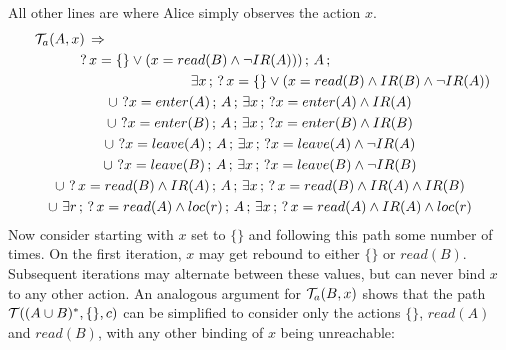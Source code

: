 All other lines are where Alice simply observes the action $x$. \begin{gather*}
\mathcal{T}_{a}(A,x)\,\Rightarrow\,\,\,\,\,\,\,\,\,\,\,\,\,\,\,\,\,\,\,\,\,\,\,\,\,\,\,\,\,\,\,\,\,\,\,\,\,\,\,\,\,\,\,\,\,\,\,\,\,\,\,\,\,\,\,\,\,\,\,\,\,\,\,\,\,\,\,\,\,\,\,\,\,\,\,\,\,\,\,\,\,\,\,\,\,\,\,\,\,\,\,\,\,\,\,\,\,\,\,\,\,\,\,\,\,\,\,\,\,\,\,\,\,\,\,\,\,\,\,\,\,\,\,\,\,\,\,\,\,\,\,\,\,\,\,\,\,\,\,\,\,\,\,\,\,\,\,\,\,\,\,\,\,\,\,\,\,\,\,\,\,\,\,\\
?\, x=\{\}\vee(x=read(B)\wedge\neg IR(A)))\,;\, A\,;\,\,\,\,\,\,\,\,\,\,\,\,\,\,\,\,\,\,\,\,\,\,\,\,\,\,\,\,\,\,\,\,\,\,\,\,\,\,\,\,\,\,\,\,\,\,\,\\
\,\,\,\,\,\,\,\,\,\,\,\,\,\,\,\,\,\,\,\,\,\,\,\,\,\,\,\,\,\,\,\,\,\,\,\,\,\,\,\,\,\,\,\,\,\,\,\,\,\,\,\,\,\,\,\,\,\,\,\,\,\,\,\,\,\,\,\,\,\exists x\,;\,?\, x=\{\}\vee(x=read(B)\wedge IR(B)\wedge\neg IR(A))\\
\cup\,\,?x=enter(A)\,;\, A\,;\,\exists x\,;\,?x=enter(A)\wedge IR(A)\\
\cup\,\,?x=enter(B)\,;\, A\,;\,\exists x\,;\,?x=enter(B)\wedge IR(B)\\
\cup\,\,?x=leave(A)\,;\, A\,;\,\exists x\,;\,?x=leave(A)\wedge\neg IR(A)\\
\cup\,\,?x=leave(B)\,;\, A\,;\,\exists x\,;\,?x=leave(B)\wedge\neg IR(B)\\
\cup\,\,?\, x=read(B)\wedge IR(A)\,;\, A\,;\,\exists x\,;\,?\, x=read(B)\wedge IR(A)\wedge IR(B)\\
\cup\,\,\exists r\,;\,?\, x=read(A)\wedge loc(r)\,;\, A\,;\,\exists x\,;\,?\, x=read(A)\wedge IR(A)\wedge loc(r)\end{gather*}
 Now consider starting with $x$ set to $\{\}$ and following this
path some number of times. On the first iteration, $x$ may get rebound
to either $\{\}$ or $read(B)$. Subsequent iterations may alternate
between these values, but can never bind $x$ to any other action.
An analogous argument for $\mathcal{T}_{a}(B,x)$ shows that the path $\mathcal{T}((A\cup B)^{*},\{\},c)$
can be simplified to consider only the actions $\{\}$, $read(A)$
and $read(B)$, with any other binding of $x$ being unreachable:

